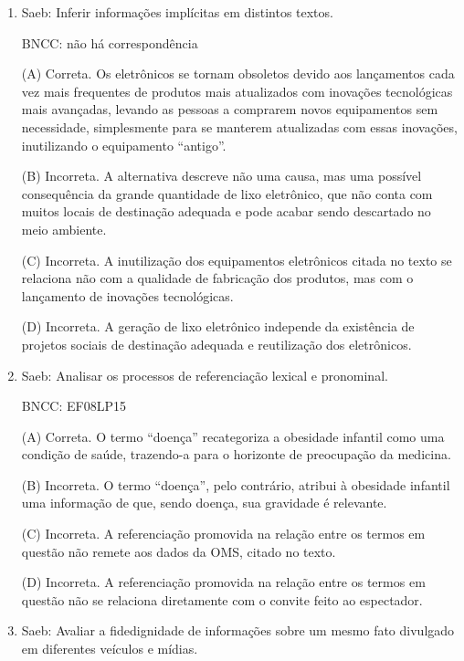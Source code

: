 \begin{enumerate}

	\item

	Saeb: Inferir informações implícitas em distintos textos.

BNCC: não há correspondência

(A) Correta. Os eletrônicos se tornam obsoletos devido aos lançamentos
cada vez mais frequentes de produtos mais atualizados com inovações
tecnológicas mais avançadas, levando as pessoas a comprarem novos
equipamentos sem necessidade, simplesmente para se manterem atualizadas
com essas inovações, inutilizando o equipamento ``antigo''.

(B) Incorreta. A alternativa descreve não uma causa, mas uma possível
consequência da grande quantidade de lixo eletrônico, que não conta com
muitos locais de destinação adequada e pode acabar sendo descartado no
meio ambiente.

(C) Incorreta. A inutilização dos equipamentos eletrônicos citada no
texto se relaciona não com a qualidade de fabricação dos produtos, mas
com o lançamento de inovações tecnológicas.

(D) Incorreta. A geração de lixo eletrônico independe da existência de
projetos sociais de destinação adequada e reutilização dos eletrônicos.


\item

Saeb: Analisar os processos de referenciação lexical e pronominal.

BNCC: EF08LP15

(A) Correta. O termo ``doença'' recategoriza a obesidade infantil como
uma condição de saúde, trazendo-a para o horizonte de preocupação da
medicina.

(B) Incorreta. O termo ``doença'', pelo contrário, atribui à obesidade
infantil uma informação de que, sendo doença, sua gravidade é relevante.

(C) Incorreta. A referenciação promovida na relação entre os termos em
questão não remete aos dados da OMS, citado no texto.

(D) Incorreta. A referenciação promovida na relação entre os termos em
questão não se relaciona diretamente com o convite feito ao espectador.


\item

Saeb: Avaliar a fidedignidade de informações sobre um mesmo fato
divulgado em diferentes veículos e mídias.


\end{enumerate}
